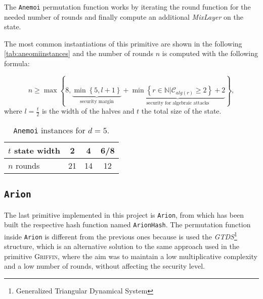 \documentclass[12pt, a4paper]{report}
\begin{document}
The \texttt{Anemoi} permutation function works by iterating the round function for the needed number of rounds and finally compute an additional \textit{MixLayer} on the state.

The most common instantiations of this primitive are shown in the following \autoref{tab:aneomiinstances} and the number of rounds $n$ is computed with the following formula:

\begin{equation}
  n \ge \max \left\{ 8, \underbrace{\min \left\{ 5, l+1 \right\}}_{\text{security margin}} + \underbrace{\min \left\{ r \in \mathbb{N} | \mathcal{C}_{alg(r)} \ge 2 \right\} + 2}_{\text{security for algebraic attacks}} \right\}
  \label{eq:anemoirounds},
\end{equation}
where $l = \frac{t}{2}$ is the width of the halves and $t$ the total size of the state.

\begin{table}[H]
  \caption{\texttt{Anemoi} instances for $d = 5$.}\label{tab:aneomiinstances}
  \begin{center}
    \begin{tabular}{|l|c|c|c|}
      \hline
      $t$ state width & 2 & 4 & 6/8 \\
      \hline
      $n$ rounds & 21 & 14 & 12 \\
      \hline
    \end{tabular}
  \end{center}
\end{table}
\subsection{\texttt{Arion}}\label{subsec:arion}

The last primitive implemented in this project is \texttt{Arion}, from which has been built the respective hash function named \texttt{ArionHash}.
The permutation function inside \texttt{Arion} is different from the previous ones because is used the \textit{GTDS}\footnote{Generalized Triangular Dynamical System} structure\cite{gtds}, which is an alternative solution to the same approach used in the primitive \textsc{Griffin}, where the aim was to maintain a low multiplicative complexity and a low number of rounds, without affecting the security level.
\end{document}
